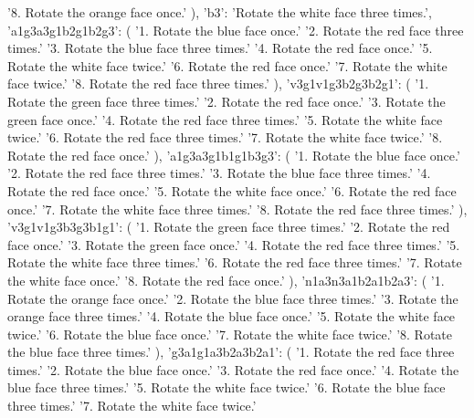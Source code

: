 {{            '8. Rotate the orange face once.'
        ),
        'b3': 'Rotate the white face three times.',
        'a1g3a3g1b2g1b2g3': (
            '1. Rotate the blue face once.\n'
            '2. Rotate the red face three times.\n'
            '3. Rotate the blue face three times.\n'
            '4. Rotate the red face once.\n'
            '5. Rotate the white face twice.\n'
            '6. Rotate the red face once.\n'
            '7. Rotate the white face twice.\n'
            '8. Rotate the red face three times.'
        ),
        'v3g1v1g3b2g3b2g1': (
            '1. Rotate the green face three times.\n'
            '2. Rotate the red face once.\n'
            '3. Rotate the green face once.\n'
            '4. Rotate the red face three times.\n'
            '5. Rotate the white face twice.\n'
            '6. Rotate the red face three times.\n'
            '7. Rotate the white face twice.\n'
            '8. Rotate the red face once.'
        ),
        'a1g3a3g1b1g1b3g3': (
            '1. Rotate the blue face once.\n'
            '2. Rotate the red face three times.\n'
            '3. Rotate the blue face three times.\n'
            '4. Rotate the red face once.\n'
            '5. Rotate the white face once.\n'
            '6. Rotate the red face once.\n'
            '7. Rotate the white face three times.\n'
            '8. Rotate the red face three times.'
        ),
        'v3g1v1g3b3g3b1g1': (
            '1. Rotate the green face three times.\n'
            '2. Rotate the red face once.\n'
            '3. Rotate the green face once.\n'
            '4. Rotate the red face three times.\n'
            '5. Rotate the white face three times.\n'
            '6. Rotate the red face three times.\n'
            '7. Rotate the white face once.\n'
            '8. Rotate the red face once.'
        ),
        'n1a3n3a1b2a1b2a3': (
            '1. Rotate the orange face once.\n'
            '2. Rotate the blue face three times.\n'
            '3. Rotate the orange face three times.\n'
            '4. Rotate the blue face once.\n'
            '5. Rotate the white face twice.\n'
            '6. Rotate the blue face once.\n'
            '7. Rotate the white face twice.\n'
            '8. Rotate the blue face three times.'
        ),
        'g3a1g1a3b2a3b2a1': (
            '1. Rotate the red face three times.\n'
            '2. Rotate the blue face once.\n'
            '3. Rotate the red face once.\n'
            '4. Rotate the blue face three times.\n'
            '5. Rotate the white face twice.\n'
            '6. Rotate the blue face three times.\n'
            '7. Rotate the white face twice.\n'
}}

